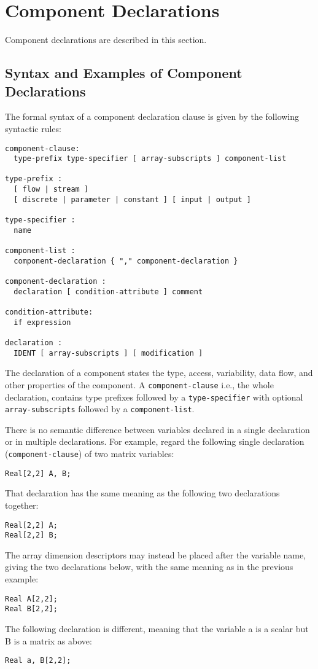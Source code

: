 \section{Component Declarations}\label{component-declarations}

Component declarations are described in this section.

\subsection{Syntax and Examples of Component Declarations}\label{syntax-and-examples-of-component-declarations}

The formal syntax of a component declaration clause is given by the
following syntactic rules:
\begin{lstlisting}[language=grammar]
component-clause:
  type-prefix type-specifier [ array-subscripts ] component-list

type-prefix :
  [ flow | stream ]
  [ discrete | parameter | constant ] [ input | output ]

type-specifier :
  name

component-list :
  component-declaration { "," component-declaration }

component-declaration :
  declaration [ condition-attribute ] comment

condition-attribute:
  if expression

declaration :
  IDENT [ array-subscripts ] [ modification ]
\end{lstlisting}

\begin{nonnormative}
The declaration of a component states the type, access,
variability, data flow, and other properties of the component. A
\lstinline!component-clause! i.e., the whole declaration, contains type
prefixes followed by a \lstinline!type-specifier! with optional
\lstinline!array-subscripts! followed by a \lstinline!component-list!.

There is no semantic difference between variables declared in a
single declaration or in multiple declarations. For example, regard the
following single declaration (\lstinline!component-clause!) of two matrix
variables:
\begin{lstlisting}[language=modelica]
Real[2,2] A, B;
\end{lstlisting}
That declaration has the same meaning as the following two
declarations together:
\begin{lstlisting}[language=modelica]
Real[2,2] A;
Real[2,2] B;
\end{lstlisting}
The array dimension descriptors may instead be placed after the
variable name, giving the two declarations below, with the same meaning
as in the previous example:
\begin{lstlisting}[language=modelica]
Real A[2,2];
Real B[2,2];
\end{lstlisting}
The following declaration is different, meaning that the variable
a is a scalar but B is a matrix as above:
\begin{lstlisting}[language=modelica]
Real a, B[2,2];
\end{lstlisting}
\end{nonnormative}

